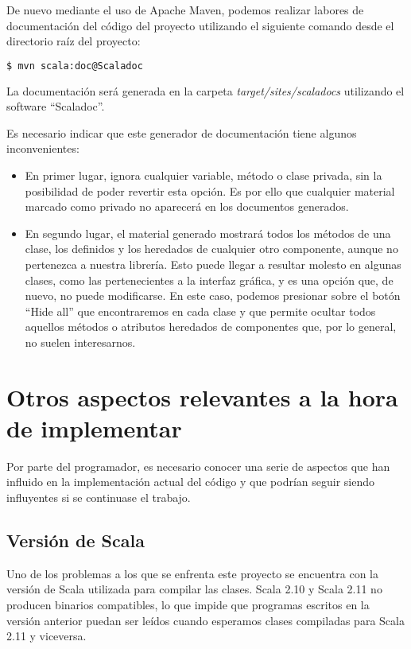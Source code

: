 De nuevo mediante el uso de Apache Maven, podemos realizar labores de documentación del código del proyecto utilizando el siguiente comando desde el directorio raíz del proyecto:

\begin{lstlisting}[language=bash]
$ mvn scala:doc@Scaladoc
\end{lstlisting}

La documentación será generada en la carpeta \textit{target/sites/scaladocs} utilizando el software ``Scaladoc''.

Es necesario indicar que este generador de documentación tiene algunos inconvenientes:
\begin{itemize}
\item En primer lugar, ignora cualquier variable, método o clase privada, sin la posibilidad de poder revertir esta opción. Es por ello que cualquier material marcado como privado no aparecerá en los documentos generados.
\item En segundo lugar, el material generado mostrará todos los métodos de una clase, los definidos y los heredados de cualquier otro componente, aunque no pertenezca a nuestra librería. Esto puede llegar a resultar molesto en algunas clases, como las pertenecientes a la interfaz gráfica, y es una opción que, de nuevo, no puede modificarse. En este caso, podemos presionar sobre el botón ``Hide all'' que encontraremos en cada clase y que permite ocultar todos aquellos métodos o atributos heredados de componentes que, por lo general, no suelen interesarnos.
\end{itemize}
 


\section{Otros aspectos relevantes a la hora de implementar}
Por parte del programador, es necesario conocer una serie de aspectos que han influido en la implementación actual del código y que podrían seguir siendo influyentes si se continuase el trabajo.

\subsection{Versión de Scala}

Uno de los problemas a los que se enfrenta este proyecto se encuentra con la versión de Scala utilizada para compilar las clases. Scala 2.10 y Scala 2.11 no producen binarios compatibles, lo que impide que programas escritos en la versión anterior puedan ser leídos cuando esperamos clases compiladas para Scala 2.11 y viceversa.


